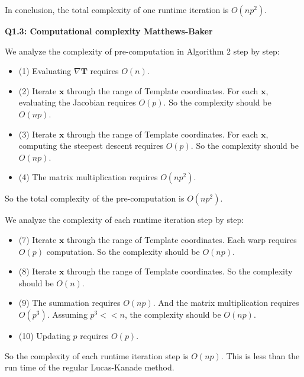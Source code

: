 \documentclass[
  course = {{16-720B Computer Vision}},
  quartile = {{1}},
  assignment = 6\ -\ Object\ Tracking\ in\ Videos,
  name = {{Kangle Deng}},
  email = {{kangled@andrew.cmu.edu}},
  firstexercise = 1
]{aga-homework}
\begin{document}
In conclusion, the total complexity of one runtime iteration is $O(np^2)$.

\noindent\textbf{Q1.3: Computational complexity Matthews-Baker}

We analyze the complexity of pre-computation in Algorithm 2 step by step:
\begin{itemize}
    \item (1) Evaluating $\nabla \mathbf{T}$ requires $O(n)$.
    \item (2) Iterate $\mathbf{x}$ through the range of Template coordinates. For each $\mathbf{x}$, evaluating the Jacobian requires $O(p)$. So the complexity should be $O(np)$.
    \item (3) Iterate $\mathbf{x}$ through the range of Template coordinates. For each $\mathbf{x}$, computing the steepest descent requires $O(p)$. So the complexity should be $O(np)$.
    \item (4) The matrix multiplication requires $O(np^2)$.
\end{itemize}

So the total complexity of the pre-computation is $O(np^2)$.

We analyze the complexity of each runtime iteration step by step:
\begin{itemize}
    \item (7) Iterate $\mathbf{x}$ through the range of Template coordinates. Each warp requires $O(p)$ computation. So the complexity should be $O(np)$.
    \item (8) Iterate $\mathbf{x}$ through the range of Template coordinates. So the complexity should be $O(n)$.
    \item (9) The summation requires $O(np)$. And the matrix multiplication requires $O(p^3)$. Assuming $p^3 << n$, the complexity should be $O(np)$.
    \item (10) Updating $p$ requires $O(p)$.
\end{itemize}

So the complexity of each runtime iteration step is $O(np)$. This is less than the run time of the regular Lucas-Kanade method.
\end{document}
